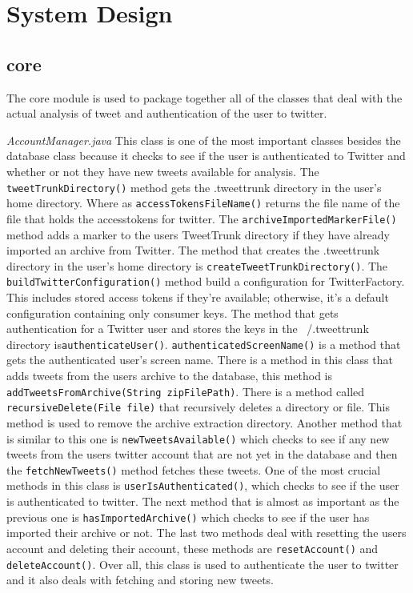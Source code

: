 \documentclass[a4paper, 12pt]{article}
\begin{document}
\section{System Design} \label{sec:sysarch}
\begin{adjustwidth}{2em}{0pt}
\subsection{core} \label{sec:archd}
\begin{adjustwidth}{2em}{0pt}
The core module is used to package together all of the classes that deal with the actual analysis of tweet and authentication of the user to twitter.\newline


\noindent  \textit{AccountManager.java}  \newline
This class is one of the most important classes besides the database class because it checks to see if the user is authenticated to Twitter and whether or not they have new tweets available for analysis. The \texttt{tweetTrunkDirectory()} method gets the .tweettrunk directory in the user's home directory. Where as \texttt {accessTokensFileName()} returns the file name of the file that holds the accesstokens for twitter. The \texttt{archiveImportedMarkerFile()} method adds a marker to the users TweetTrunk directory if they have already imported an archive from Twitter. The method that creates the .tweettrunk directory in the user's home directory is \texttt{createTweetTrunkDirectory()}. The \newline\texttt{buildTwitterConfiguration()} method build a configuration for TwitterFactory. This includes stored access tokens if they're available; otherwise, it's a default configuration containing only consumer keys. The method that gets authentication for a Twitter user and stores the keys in the ~/.tweettrunk directory is\texttt{authenticateUser()}. \texttt{authenticatedScreenName()} is a method that gets the authenticated user's screen name. There is a method in this class that adds tweets from the users archive to the database, this method is \texttt{addTweetsFromArchive(String zipFilePath)}. There is a method called   \texttt{recursiveDelete(File file)} that recursively deletes a directory or file. This method is used to remove the archive extraction directory. Another method that is similar to this one is \texttt{newTweetsAvailable()} which checks to see if any new tweets from the users twitter account that are not yet in the database and then the \texttt{fetchNewTweets()} method fetches these tweets. One of the most crucial methods in this class is \texttt{userIsAuthenticated()}, which checks to see if the user is authenticated to twitter. The next method that is almost as important as the previous one is \texttt{hasImportedArchive()} which checks to see if the user has imported their archive or not. The last two methods deal with resetting the users account and deleting their account, these methods are \texttt{resetAccount()} and \texttt{deleteAccount()}. Over all, this class is used to authenticate the user to twitter and it also deals with fetching and storing new tweets. \newline\newline


\end{adjustwidth}
\end{adjustwidth}
\end{document}
